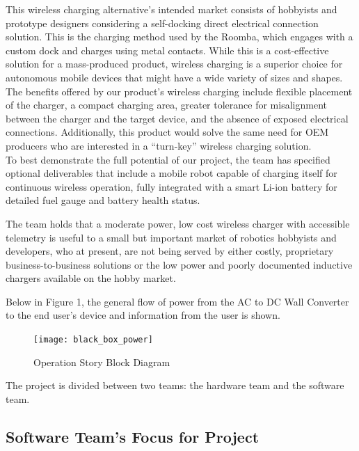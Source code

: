 \documentclass[12pt]{article}
\begin{document}
This wireless charging alternative's intended market consists of hobbyists and prototype designers considering a self-docking direct electrical connection solution. This is the charging method used by the Roomba\cite{RoombaEduData}, which engages with a custom dock and charges using metal contacts. While this is a cost-effective solution for a mass-produced product, wireless charging is a superior choice for autonomous mobile devices that might have a wide variety of sizes and shapes. The benefits offered by our product's wireless charging include flexible placement of the charger, a compact charging area, greater tolerance for misalignment between the charger and the target device, and the absence of exposed electrical connections.  Additionally, this product would solve the same need for OEM producers who are interested in a ``turn-key'' wireless charging solution.\\

\pagebreak
\indent
To best demonstrate the full potential of our project, the team has specified optional deliverables that include a mobile robot capable of charging itself for continuous wireless operation, fully integrated with a smart Li-ion battery for detailed fuel gauge and battery health status.\\ \indent %

The team holds that a moderate power, low cost wireless charger with accessible telemetry is useful to a small but important market of robotics hobbyists and developers, who at present, are not being served by either costly, proprietary business-to-business solutions or the low power and poorly documented inductive chargers available on the hobby market.\\ \indent

Below in Figure 1, the general flow of power from the AC to DC Wall Converter to the end user's device and information from the user is shown.
\hfill 
\begin{figure}[h!]
\centering
\texttt{[image: black\_box\_power]}
\caption{Operation Story Block Diagram}
\end{figure}

\indent
The project is divided between two teams: the hardware team and the software team.

\subsection{Software Team's Focus for Project}
\end{document}

